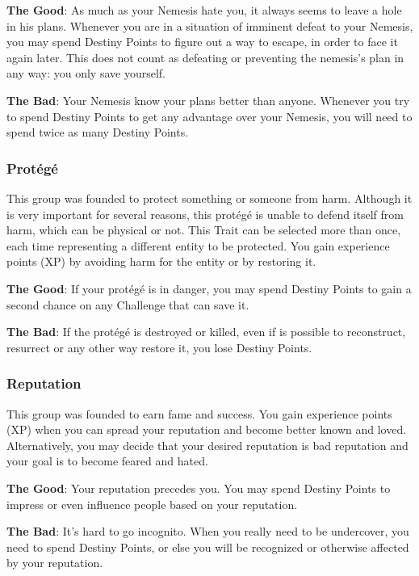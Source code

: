 \begin{multicols}{2}
\textbf{The Good}: As much as your Nemesis hate you, it always seems to leave a hole in his plans. Whenever you are in a situation of imminent defeat to your Nemesis, you may spend Destiny Points to figure out a way to escape, in order to face it again later. This does not count as defeating or preventing the nemesis’s plan in any way: you only save yourself.

\textbf{The Bad}: Your Nemesis know your plans better than anyone. Whenever you try to spend Destiny Points to get any advantage over your Nemesis, you will need to spend twice as many Destiny Points.

\subsubsection{Prot\'eg\'e}
This group was founded to protect something or someone from harm. Although it is very important for several reasons, this protégé is unable to defend itself from harm, which can be physical or not. This Trait can be selected more than once, each time representing a different entity to be protected. You gain experience points (XP) by avoiding harm for the entity or by restoring it.

\textbf{The Good}: If your prot\'eg\'e is in danger, you may spend Destiny Points to gain a second chance on any Challenge that can save it.

\textbf{The Bad}: If the protégé is destroyed or killed, even if is possible to reconstruct, resurrect or any other way restore it, you lose Destiny Points.

\subsubsection{Reputation}
This group was founded to earn fame and success. You gain experience points (XP) when you can spread your reputation and become better known and loved. Alternatively, you may decide that your desired reputation is bad reputation and your goal is to become feared and hated.

\textbf{The Good}: Your reputation precedes you. You may spend Destiny Points to impress or even influence people based on your reputation.

\textbf{The Bad}: It's hard to go incognito. When you really need to be undercover, you need to spend Destiny Points, or else you will be recognized or otherwise affected by your reputation.
\end{multicols}

